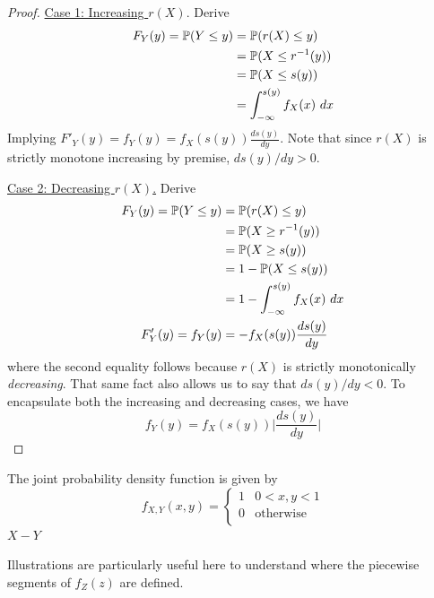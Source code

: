 \documentclass[a4paper]{article}
\begin{document}
\begin{proof}[Proof] 
\underline{Case 1: Increasing \(r(X).\)} Derive
\begin{align*}
	F_{Y}(y) = \mathbb{P}(Y \le y) & = \mathbb{P}(r(X) \le y) \\
	 & = \mathbb{P}(X \le r^{-1}(y)) \\
	 & = \mathbb{P}(X \le s(y)) \\
	 & = \int^{s(y)}_{-\infty} f_{X}(x) \ dx 
\end{align*}
Implying \(F'_{Y}(y) = f_{Y}(y) = f_{X}(s(y)) \frac{d s(y)}{d y} \). Note that since \(r(X)\) is strictly monotone increasing by premise, \(ds(y)/dy > 0\).
\vspace{12pt}
\par \underline{Case 2: Decreasing \(r(X)\).} Derive
\begin{align*}
	F_{Y}(y) = \mathbb{P}(Y \le y) & = \mathbb{P}(r(X) \le y)  \\
	 & = \mathbb{P}(X \ge r^{-1}(y)) \\
	 & = \mathbb{P}(X \ge s(y)) \\
	 & = 1 - \mathbb{P}(X \le s(y)) \\
	 & = 1 - \int^{s(y)}_{-\infty} f_{X}(x) \ dx \\
	F'_{Y}(y) = f_{Y}(y) & = - f_{X}(s(y)) \frac{d s(y)}{d y} 
\end{align*}
where the second equality follows because \(r(X)\) is strictly monotonically \textit{decreasing}. That same fact also allows us to say that \(ds(y) / dy < 0\). To encapsulate both the increasing and decreasing cases, we have
\[
	f_{Y}(y) = f_{X}(s(y)) \bigg| \frac{d s(y)}{d y}  \bigg| 
\]
\end{proof}


The joint probability density function is given by
\[
	f_{X,Y}(x,y) = \begin{cases}
		1 & 0 < x, y < 1 \\
		0 & \text{otherwise} \\
	\end{cases}
\]
\underline{\(X - Y\)}

\par Illustrations are particularly useful here to understand where the piecewise segments of \(f_{Z}(z)\) are defined.
\end{document}
